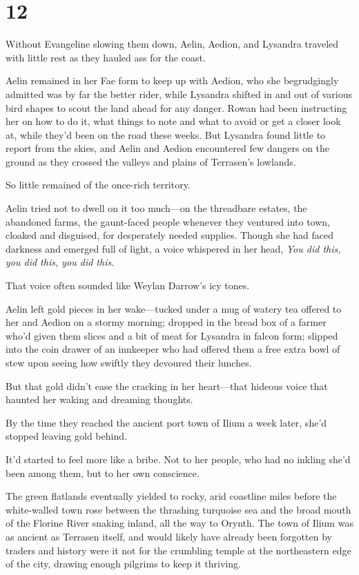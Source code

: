 
\chapter{12}

Without Evangeline slowing them down, Aelin, Aedion, and Lysandra traveled with little rest as they hauled ass for the coast.

Aelin remained in her Fae form to keep up with Aedion, who she begrudgingly admitted was by far the better rider, while Lysandra shifted in and out of various bird shapes to scout the land ahead for any danger. Rowan had been instructing her on how to do it, what things to note and what to avoid or get a closer look at, while they'd been on the road these weeks. But Lysandra found little to report from the skies, and Aelin and Aedion encountered few dangers on the ground as they crossed the valleys and plains of Terrasen's lowlands.

So little remained of the once-rich territory.

Aelin tried not to dwell on it too much---on the threadbare estates, the abandoned farms, the gaunt-faced people whenever they ventured into town, cloaked and disguised, for desperately needed supplies. Though she had faced darkness and emerged full of light, a voice whispered in her head, \emph{You did this, you did this, you did this}.

That voice often sounded like Weylan Darrow's icy tones.

Aelin left gold pieces in her wake---tucked under a mug of watery tea offered to her and Aedion on a stormy morning; dropped in the bread box of a farmer who'd given them slices and a bit of meat for Lysandra in falcon form; slipped into the coin drawer of an innkeeper who had offered them a free extra bowl of stew upon seeing how swiftly they devoured their lunches.

But that gold didn't ease the cracking in her heart---that hideous voice that haunted her waking and dreaming thoughts.

By the time they reached the ancient port town of Ilium a week later, she'd stopped leaving gold behind.

It'd started to feel more like a bribe. Not to her people, who had no inkling she'd been among them, but to her own conscience.

The green flatlands eventually yielded to rocky, arid coastline miles before the white-walled town rose between the thrashing turquoise sea and the broad mouth of the Florine River snaking inland, all the way to Orynth. The town of Ilium was as ancient as Terrasen itself, and would likely have already been forgotten by traders and history were it not for the crumbling temple at the northeastern edge of the city, drawing enough pilgrims to keep it thriving.

